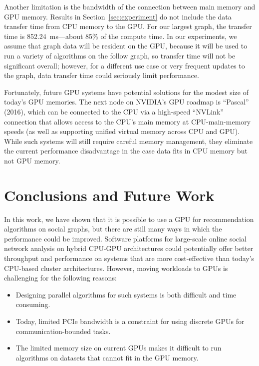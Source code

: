 \documentclass{article}
\begin{document}
Another limitation is the bandwidth of the connection between main memory
and GPU memory. Results in Section~\ref{sec:experiment} do not include the
data transfer time from CPU memory to the GPU\@. For our largest graph,
the transfer time is 852.24~ms---about 85\% of the compute time. In our
experiments, we assume that graph data will be resident on the GPU, because
it will be used to run a variety of algorithms on the follow graph, so
transfer time will not be significant overall; however, for a different use
case or very frequent updates to the graph, data transfer time could
seriously limit performance.

Fortunately, future GPU systems have potential solutions for the modest
size of today's GPU memories. The next node on NVIDIA's GPU roadmap is
``Pascal'' (2016), which can be connected to the CPU via a high-speed
``NVLink'' connection that allows access to the CPU's main memory at
CPU-main-memory speeds (as well as supporting unified virtual memory across
CPU and GPU\@). While such systems will still require careful memory
management, they eliminate the current performance disadvantage in the case
data fits in CPU memory but not GPU memory.

\section{Conclusions and Future Work} In this work, we have shown that it
is possible to use a GPU for recommendation algorithms on social graphs,
but there are still many ways in which the performance could be improved.
Software platforms for large-scale online social network analysis on hybrid
CPU-GPU architectures could potentially offer better throughput and
performance on systems that are more cost-effective than today's CPU-based
cluster architectures. However, moving workloads to GPUs is challenging for
the following reasons:

\begin{itemize}
	\item Designing parallel algorithms for such systems is both difficult and
	      time consuming.
	\item Today, limited PCIe bandwidth is a constraint for using discrete GPUs
	      for communication-bounded tasks.
	\item The limited memory size on current GPUs makes it difficult to run
	      algorithms on datasets that cannot fit in the GPU memory.
\end{itemize}
\end{document}
